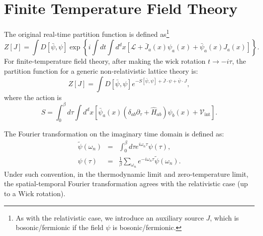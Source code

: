 \section{Finite Temperature Field Theory}
The original real-time partition function is defined as\footnote{As with the relativistic case, we introduce an auxiliary source $J$, which is bosonic/fermionic if the field $\psi$ is bosonic/fermionic.
}
\begin{equation}
	Z[J] = \int D[\bar\psi,\psi] \exp\left\{i\int dt \int d^dx \left[\mathcal{L}+\bar{J}_a(x)\psi_a(x)+\bar{\psi}_a(x)J_a(x)\right]\right\}.
\end{equation}
For finite-temperature field theory, after making the wick rotation $t \rightarrow -i\tau$, the partition function for a generic non-relativistic lattice theory is:
\begin{equation}
	Z[J] = \int D[\bar\psi,\psi] e^{-S[\bar\psi,\psi]+\bar{J}\cdot\psi+\bar{\psi}\cdot J},
\end{equation}
where the action is
\begin{equation}
	S = \int_0^\beta d\tau \int d^dx \left[\bar\psi_a(x) (\delta_{ab}\partial_\tau+\hat H_{ab})\psi_b(x) + \mathcal{V}_{\mathrm{int}}\right].
\end{equation}

\begin{framedrmk}
The Fourier transformation on the imaginary time domain is defined as:
\begin{eqnarray}
	\tilde\psi(\omega_n) &=& \int_0^\beta d\tau e^{i\omega_n\tau} \psi(\tau),\\ 
	\psi(\tau) &=& \frac{1}{\beta}\sum_{\omega_n} e^{-i\omega_n\tau} \tilde\psi(\omega_n).
\end{eqnarray}
Under such convention, in the thermodynamic limit and zero-temperature limit, the spatial-temporal Fourier transformation agrees with the relativistic case (up to a Wick rotation).
\end{framedrmk}


